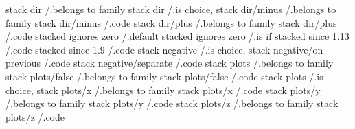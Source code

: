 stack dir                                                 /.belongs to family
stack dir                                                 /.is choice,
stack dir/minus                                           /.belongs to family
stack dir/minus                                           /.code
stack dir/plus                                            /.belongs to family
stack dir/plus                                            /.code
stacked ignores zero                                      /.default
stacked ignores zero                                      /.is if
stacked since 1.13                                        /.code
stacked since 1.9                                         /.code
stack negative                                            /.is choice,
stack negative/on previous                                /.code
stack negative/separate                                   /.code
stack plots                                               /.belongs to family
stack plots/false                                         /.belongs to family
stack plots/false                                         /.code
stack plots                                               /.is choice,
stack plots/x                                             /.belongs to family
stack plots/x                                             /.code
stack plots/y                                             /.belongs to family
stack plots/y                                             /.code
stack plots/z                                             /.belongs to family
stack plots/z                                             /.code

